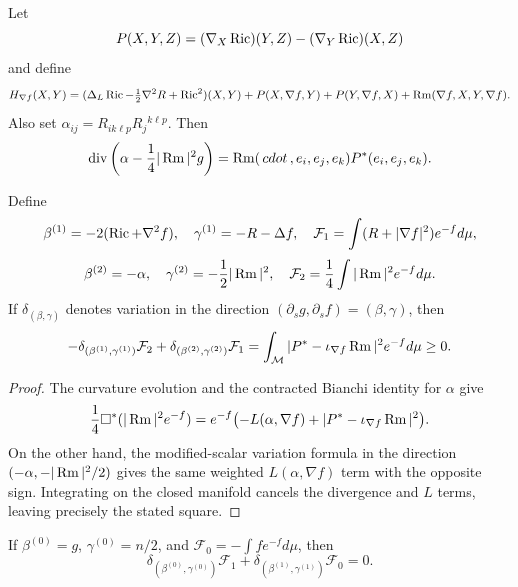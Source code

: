 \begin{definition}
\label{def:chow-iii-ch17-matrix-harnack-curvature-square}
Let
\[
 P(X,Y,Z)=(\nabla_X\operatorname{Ric})(Y,Z)-(\nabla_Y\operatorname{Ric})(X,Z)
\]
and define
\[
 H_{\nabla f}(X,Y)=
 (\Delta_L\operatorname{Ric}-\tfrac12\nabla^2R+\operatorname{Ric}^2)(X,Y)
 +P(X,\nabla f,Y)+P(Y,\nabla f,X)
 +\operatorname{Rm}(\nabla f,X,Y,\nabla f).
\]
Also set $\alpha_{ij}=R_{ik\ell p}R_j{}^{k\ell p}$.  Then
\[
 \operatorname{div}\left(\alpha-\frac14|\operatorname{Rm}|^2g\right)
 =\operatorname{Rm}(\,cdot\,,e_i,e_j,e_k)P^*(e_i,e_j,e_k).
\]
\end{definition}

\begin{theorem}
\label{thm:chow-iii-ch17-coupled-loop-variation}
Define
\[
 \beta^{(1)}=-2(\Ric+\nabla^2f),\quad \gamma^{(1)}=-R-\Delta f,
 \quad \mathcal F_1=\int(R+|\nabla f|^2)e^{-f}d\mu,
\]
\[
 \beta^{(2)}=-\alpha,\quad \gamma^{(2)}=-\frac12|\Rm|^2,
 \quad \mathcal F_2=\frac14\int|\Rm|^2e^{-f}d\mu.
\]
If $\delta_{(\beta,\gamma)}$ denotes variation in the direction
$(\partial_sg,\partial_sf)=(\beta,\gamma)$, then
\[
 -\delta_{(\beta^{(1)},\gamma^{(1)})}\mathcal F_2
 +\delta_{(\beta^{(2)},\gamma^{(2)})}\mathcal F_1
 =\int_{\mathcal M}|P^*-\iota_{\nabla f}\Rm|^2e^{-f}d\mu\ge0.
\]
\end{theorem}
\begin{proof}
The curvature evolution and the contracted Bianchi identity for $\alpha$
give
\[
 \frac14\Box^*(|\operatorname{Rm}|^2e^{-f})
 =e^{-f}\bigl(-L(\alpha,\nabla f)
 +|P^*-\iota_{\nabla f}\operatorname{Rm}|^2\bigr).
\]
On the other hand, the modified-scalar variation formula in the direction
$(-\alpha,-|\operatorname{Rm}|^2/2)$ gives the same weighted
$L(\alpha,\nabla f)$ term with the opposite sign.  Integrating on the closed
manifold cancels the divergence and $L$ terms, leaving precisely the stated
square.
\end{proof}

\begin{remark}
\label{rem:chow-iii-ch17-zeroth-loop-variation}
If $\beta^{(0)}=g$, $\gamma^{(0)}=n/2$, and
$\mathcal F_0=-\int f e^{-f}d\mu$, then
\[
 \delta_{(\beta^{(0)},\gamma^{(0)})}\mathcal F_1
 +\delta_{(\beta^{(1)},\gamma^{(1)})}\mathcal F_0=0.
\]
\end{remark}

